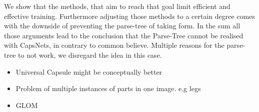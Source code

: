 \documentclass{article}
\begin{document}
We show that the methods, that aim to reach that goal limit efficient and effective training.
Furthermore adjusting those methods to a certain degree comes with the downside of preventing the parse-tree of taking form.
In the sum all those arguments lead to the conclusion that the Parse-Tree cannot be realised with CapsNets, in contrary to common believe.
Multiple reasons for the parse-tree to not work, we disregard the idea in this case.

\begin{itemize}
	\item Universal Capsule might be conceptually better
	\item Problem of multiple instances of parts in one image. e.g legs
	\item GLOM
\end{itemize}

%


\end{document}
